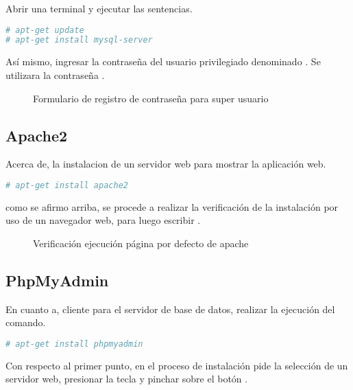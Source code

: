 Abrir una terminal y ejecutar las sentencias.

\begin{lstlisting}[language=bash, caption={Comando para instalación de gestor de base de datos}]
# apt-get update
# apt-get install mysql-server 
\end{lstlisting}

Así mismo, ingresar la contraseña del usuario privilegiado denominado 
. Se utilizara la contraseña 
.

\begin{figure}[!ht]
\centering
		\caption{Formulario de registro de contraseña para super usuario}
\end{figure}

\subsection{Apache2}

Acerca de, la instalacion de un servidor web para mostrar la aplicación web.

\begin{lstlisting}[language=bash, caption={Comando para instalación de servidor web}]
# apt-get install apache2 
\end{lstlisting}

como se afirmo arriba, se procede a realizar la verificación de la instalación
por uso de un navegador web, para luego escribir . 

\begin{figure}[!ht]
\centering
		\caption{Verificación ejecución página por defecto de apache}
\end{figure}


\subsection{PhpMyAdmin}

En cuanto a, cliente para el servidor de base de datos, realizar la ejecución
del comando.

\begin{lstlisting}[language=bash, caption={Comando para instalación de cliente para base de datos}]
# apt-get install phpmyadmin 
\end{lstlisting}

Con respecto al primer punto, en el proceso de instalación pide la selección
de un servidor web, presionar la tecla  y pinchar sobre
el botón .

